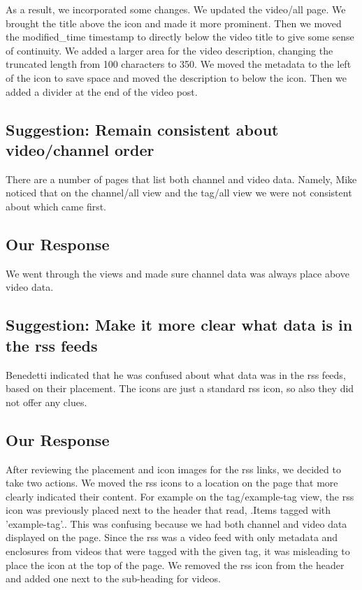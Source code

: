 \documentclass[a4paper,12pt]{report}
\begin{document}
As a result, we incorporated some changes. We updated the video/all page. 
We brought the title above the icon and made it more prominent. 
Then we moved the modified\_time timestamp to directly below the video 
title to give some sense of continuity. 
We added a larger area for the video description, changing the truncated length from 100 characters to 350. 
We moved the metadata to the left of the icon to save space and moved the description to below the icon. 
Then we added a divider at the end of the video post. 

\subsection{Suggestion: Remain consistent about video/channel order}

There are a number of pages that list both channel and video data. 
Namely, Mike noticed that on the channel/all view and the tag/all view we were not consistent about which came first. 

\subsection{Our Response}

We went through the views and made sure channel data was always place above video data.


\subsection{Suggestion: Make it more clear what data is in the rss feeds}

Benedetti indicated that he was confused about what data was in the rss feeds, based on their placement. 
The icons are just a standard rss icon, so also they did not offer any clues. 

\subsection{Our Response}

After reviewing the placement and icon images for the rss links, we decided to take two actions.
We moved the rss icons to a location on the page that more clearly indicated their content. 
For example on the tag/example-tag view, the rss icon was previously placed next to the header that read, .Items tagged 
with 'example-tag'.. 
This was confusing because we had both channel and video data displayed on the page. 
Since the rss was a video feed with only metadata and enclosures from videos that were tagged with the given tag, it was 
misleading to place the icon at the top of the page. 
We removed the rss icon from the header and added one next to the sub-heading for videos. 
\end{document}
